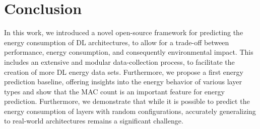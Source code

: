 \section{Conclusion}
\label{sec:conclusion}
In this work, we introduced a novel open-source framework for predicting the energy consumption of DL architectures, to allow for a trade-off between performance, energy consumption, and consequently environmental impact. This includes an extensive and modular data-collection process, to facilitate the creation of more DL energy data sets. Furthermore, we propose a first energy prediction baseline, offering insights into the energy behavior of various layer types and show that the MAC count is an important feature for energy prediction. Furthermore, we demonstrate that while it is possible to predict the energy consumption of layers with random configurations, accurately generalizing to real-world architectures remains a significant challenge.